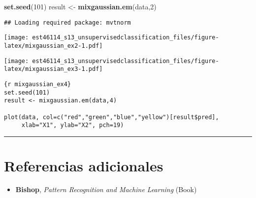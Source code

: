 \documentclass[11pt,]{article}
\newenvironment{Shaded}{\begin{snugshade}}{\end{snugshade}}
\newcommand{\KeywordTok}[1]{\textcolor[rgb]{0.13,0.29,0.53}{\textbf{#1}}}
\newcommand{\DataTypeTok}[1]{\textcolor[rgb]{0.13,0.29,0.53}{#1}}
\newcommand{\DecValTok}[1]{\textcolor[rgb]{0.00,0.00,0.81}{#1}}
\newcommand{\StringTok}[1]{\textcolor[rgb]{0.31,0.60,0.02}{#1}}
\newcommand{\OperatorTok}[1]{\textcolor[rgb]{0.81,0.36,0.00}{\textbf{#1}}}
\newcommand{\NormalTok}[1]{#1}
\providecommand{\tightlist}{%
\setlength{\itemsep}{0pt}\setlength{\parskip}{0pt}}
\begin{document}
\begin{Shaded}
\begin{Highlighting}[]
\KeywordTok{set.seed}\NormalTok{(}\DecValTok{101}\NormalTok{)}
\NormalTok{result <-}\StringTok{ }\KeywordTok{mixgaussian.em}\NormalTok{(data,}\DecValTok{2}\NormalTok{)}
\end{Highlighting}
\end{Shaded}

\begin{verbatim}
## Loading required package: mvtnorm
\end{verbatim}

\begin{Shaded}
\end{Shaded}

\texttt{[image: est46114\_s13\_unsupervisedclassification\_files/figure-latex/mixgaussian\_ex2-1.pdf]}

\begin{Shaded}
\end{Shaded}

\texttt{[image: est46114\_s13\_unsupervisedclassification\_files/figure-latex/mixgaussian\_ex3-1.pdf]}

\begin{verbatim}
{r mixgaussian_ex4}
set.seed(101)
result <- mixgaussian.em(data,4)

plot(data, col=c("red","green","blue","yellow")[result$pred], 
     xlab="X1", ylab="X2", pch=19)
\end{verbatim}

\begin{center}\rule{0.5\linewidth}{\linethickness}\end{center}

\section{Referencias adicionales}\label{referencias-adicionales}

\begin{itemize}
\tightlist
\item
  \textbf{Bishop}, \emph{Pattern Recognition and Machine Learning}
  (Book)
\end{itemize}




\newpage
\singlespacing 
\end{document}
